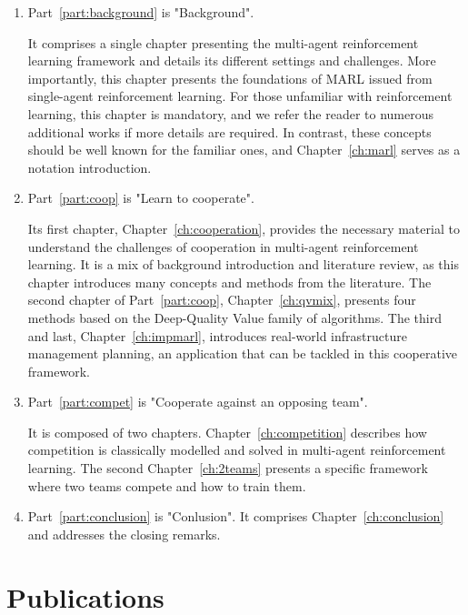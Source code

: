 \begin{enumerate}
    \item Part~\ref{part:background} is "Background".
    
    It comprises a single chapter presenting the multi-agent reinforcement learning framework and details its different settings and challenges.
    More importantly, this chapter presents the foundations of MARL issued from single-agent reinforcement learning.
    For those unfamiliar with reinforcement learning, this chapter is mandatory, and we refer the reader to numerous additional works if more details are required.
    In contrast, these concepts should be well known for the familiar ones, and Chapter~\ref{ch:marl} serves as a notation introduction.

    \item Part~\ref{part:coop} is "Learn to cooperate".
    
    Its first chapter, Chapter~\ref{ch:cooperation}, provides the necessary material to understand the challenges of cooperation in multi-agent reinforcement learning.
    It is a mix of background introduction and literature review, as this chapter introduces many concepts and methods from the literature.
    The second chapter of Part~\ref{part:coop}, Chapter~\ref{ch:qvmix}, presents four methods based on the Deep-Quality Value family of algorithms.
    The third and last, Chapter~\ref{ch:impmarl}, introduces real-world infrastructure management planning, an application that can be tackled in this cooperative framework.
    
    \item Part~\ref{part:compet} is "Cooperate against an opposing team".
    
    It is composed of two chapters.
    Chapter~\ref{ch:competition} describes how competition is classically modelled and solved in multi-agent reinforcement learning.
    The second Chapter~\ref{ch:2teams} presents a specific framework where two teams compete and how to train them.

    \item Part~\ref{part:conclusion} is "Conlusion".
    It comprises Chapter~\ref{ch:conclusion} and addresses the closing remarks.
\end{enumerate}

\section{Publications}
\label{sec:ch1_publications}

